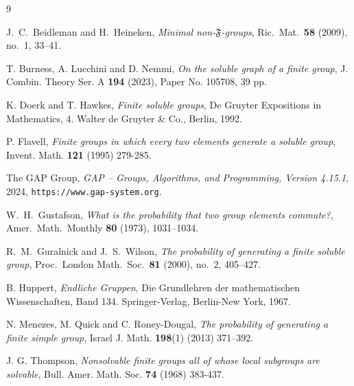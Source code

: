 \documentclass{amsart}
\begin{document}
	\begin{thebibliography}{9}
		
		J.~C.~Beidleman and H.~Heineken, 
		\textit{Minimal non-$\mathfrak{F}$-groups}, 
		Ric.\ Mat.\ \textbf{58} (2009), no.~1, 33--41.
		
		T. Burness, A. Lucchini and D. Nemmi,
		\textit{On the soluble graph of a finite group},
		J. Combin. Theory Ser. A \textbf{194} (2023), Paper No. 105708, 39 pp.
		
		  K. Doerk and T. Hawkes, \textit{Finite soluble groups}, De Gruyter Expositions in Mathematics, 4. Walter de Gruyter \& Co., Berlin, 1992.
		
		 P. Flavell, \textit{Finite groups in which every two elements generate a soluble group}, Invent. Math.
		\textbf{121} (1995) 279-285.

		The GAP Group, 
		\textit{GAP -- Groups, Algorithms, and Programming, 
			Version 4.15.1}, 2024, 
		\texttt{https://www.gap-system.org}.
		
		W.~H.~Gustafson, 
		\textit{What is the probability that two group elements commute?}, 
		Amer.\ Math.\ Monthly \textbf{80} (1973), 1031--1034.
		
		R.~M.~Guralnick and J.~S.~Wilson, 
		\textit{The probability of generating a finite soluble group}, 
		Proc.\ London Math.\ Soc.\ \textbf{81} (2000), no.~2, 405--427.
		
		 B. Huppert, \textit{Endliche Gruppen},  Die Grundlehren der mathematischen Wissenschaften, Band 134. Springer-Verlag, Berlin-New York, 1967. 
		
		 N. Menezes, M. Quick and C. Roney-Dougal,   \textit{The probability of generating a finite simple group},
		Israel J. Math. \textbf{198}(1) (2013) 371–392.
		
		 J. G. Thompson, \textit{Nonsolvable finite groups all of whose local subgroups are solvable}, Bull.
		Amer. Math. Soc. \textbf{74} (1968) 383-437.
		
	\end{thebibliography}
	
\end{document}
